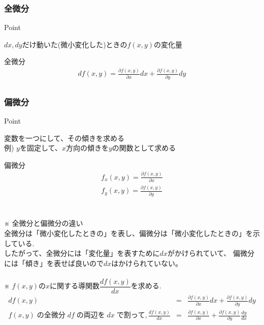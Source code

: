 \documentclass[a4paper]{jsarticle}
\begin{document}
\subsubsection{全微分}
\begin{itembox}[l]{Point}
    \begin{center}
        $dx,dy$だけ動いた(微小変化した)ときの$f\left(x,y\right)$の変化量
    \end{center}
\end{itembox}
\begin{itembox}[l]{全微分}
    \begin{eqnarray*}
        df\left(x,y\right)=\frac{\partial f\left(x,y\right)}{\partial x}dx+ \frac{\partial f\left(x,y\right)}{\partial y}dy\\
    \end{eqnarray*}
\end{itembox}
\subsubsection{偏微分}
\begin{itembox}[l]{Point}
    \begin{center}
        変数を一つにして、その傾きを求める\\
        例) $y$を固定して、$x$方向の傾きを$y$の関数として求める
    \end{center}
\end{itembox}
\begin{itembox}[l]{偏微分}
    \begin{eqnarray*}
        f_x\left(x,y\right)=\frac{\partial f\left(x,y\right)}{\partial x}\\
        f_y\left(x,y\right)=\frac{\partial f\left(x,y\right)}{\partial y}\\
    \end{eqnarray*}
\end{itembox}
\\
※ 全微分と偏微分の違い\\
全微分は「微小変化したときの」を表し、偏微分は「微小変化したときの」を示している.\\
したがって、全微分には「変化量」を表すために$dx$がかけられていて、
偏微分には「傾き」を表せば良いので$dx$はかけられていない。
\\ \\
※ $f\left(x,y\right)$の$x$に関する導関数$\dfrac{df\left(x,y\right)}{dx}$を求める.\\
\begin{eqnarray*}
    df\left(x,y\right)&=&\frac{\partial f\left(x,y\right)}{\partial x}dx+ \frac{\partial f\left(x,y\right)}{\partial y}dy\\
    f\left(x,y\right)\; の全微分\; df \; の両辺を\; dx\; で割って,
    \frac{d f\left(x,y\right)}{dx}&=&\frac{\partial f\left(x,y\right)}{\partial x}+ \frac{\partial f\left(x,y\right)}{\partial y}\frac{dy}{dx}\\
\end{eqnarray*}
\end{document}

